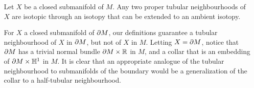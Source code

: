 \begin{theorem}
	Let $X$ be a closed submanifold of $M$.
	Any two proper tubular neighbourhoods of $X$ are isotopic through an isotopy that can be extended to an ambient isotopy.
\end{theorem}






For $X$ a closed submanifold of $\partial M$, our definitions guarantee a tubular neighbourhood of $X$ in $\partial M$, but not of $X$ in $M$.
Letting $X=\partial M$, notice that $\partial M$ has a trivial normal bundle $\partial M\times \mathbb{R}$ in $M$, and a collar that is an embedding of $\partial M\times\mathbb{H}^1$ in $M$.
It is clear that an appropriate analogue of the tubular neighbourhood to submanifolds of the boundary would be a generalization of the collar to a half-tubular neighbourhood.

